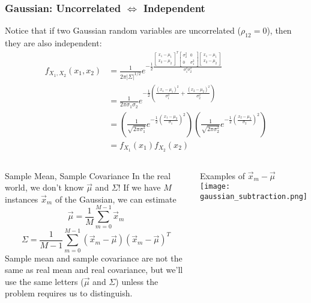 \documentclass{beamer}
\begin{document}
\begin{frame}
  \frametitle{Gaussian: Uncorrelated $\Leftrightarrow$ Independent}

  Notice that if two Gaussian random variables are uncorrelated
  ($\rho_{12}=0$), then they are also independent:
  \begin{align*}
    f_{X_1,X_2}(x_1,x_2)
    &=\frac{1}{2\pi|\Sigma|^{1/2}}
    e^{-\frac{1}{2}
      \frac{\left[\begin{array}{c}x_1-\mu_1\\x_2-\mu_2\end{array}\right]^T
        \left[\begin{array}{cc}\sigma_2^2&0\\0&\sigma_1^2\end{array}\right]
        \left[\begin{array}{c}x_1-\mu_1\\x_2-\mu_2\end{array}\right]}
      {\sigma_1^2\sigma_2^2}}\\
    &=\frac{1}{2\pi\sigma_1\sigma_2}
    e^{-\frac{1}{2}\left(\frac{(x_1-\mu_1)^2}{\sigma_1^2}+\frac{(x_2-\mu_2)^2}{\sigma_2^2}\right)}\\
    &=\left(\frac{1}{\sqrt{2\pi\sigma_1^2}}e^{-\frac{1}{2}\left(\frac{x_1-\mu_2}{\sigma_1}\right)^2}\right)
    \left(\frac{1}{\sqrt{2\pi\sigma_2^2}}e^{-\frac{1}{2}\left(\frac{x_2-\mu_2}{\sigma_2}\right)^2}\right)
    \\
    &=f_{X_1}(x_1)f_{X_2}(x_2)
  \end{align*}
\end{frame}  

\begin{frame}
  \begin{columns}
    \column{2.25in}
    \begin{block}{Sample Mean, Sample Covariance}
      In the real world, we don't know $\vec\mu$ and $\Sigma$!
      If we have $M$  instances $\vec{x}_m$  of the Gaussian,
      we can estimate
      \[
      \vec\mu=\frac{1}{M}\sum_{m=0}^{M-1}\vec{x}_m
      \]
      \[
      \Sigma=\frac{1}{M-1}\sum_{m=0}^{M-1}(\vec{x}_m-\vec\mu)(\vec{x}_m-\vec\mu)^T
      \]
      Sample mean and sample covariance are not the same as real mean
      and real covariance, but we'll use the same letters ($\vec\mu$
      and $\Sigma$) unless the problem requires us to distinguish.
    \end{block}
    \column{2in}
    \begin{block}{Examples of $\vec{x}_m-\vec\mu$}
      \texttt{[image: gaussian\_subtraction.png]}
    \end{block}
  \end{columns}
\end{frame}
\end{document}
